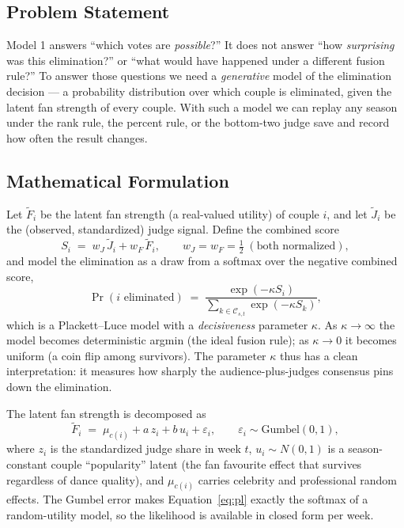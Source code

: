 \documentclass{article}
\begin{document}
\subsection{Problem Statement}

Model 1 answers ``which votes are \emph{possible}?'' It does not answer ``how
\emph{surprising} was this elimination?'' or ``what would have happened under a different
fusion rule?'' To answer those questions we need a \emph{generative} model of the
elimination decision --- a probability distribution over which couple is eliminated, given
the latent fan strength of every couple. With such a model we can replay any season under
the rank rule, the percent rule, or the bottom-two judge save and record how often the
result changes.

\subsection{Mathematical Formulation}

Let $\tilde F_i$ be the latent fan strength (a real-valued utility) of couple $i$, and let
$\tilde J_i$ be the (observed, standardized) judge signal. Define the combined score
\begin{equation}
S_i \;=\; w_J\,\tilde J_i + w_F\,\tilde F_i, \qquad w_J=w_F=\tfrac12 \;(\text{both normalized}),
\end{equation}
and model the elimination as a draw from a softmax over the negative combined score,
\begin{equation}
\Pr(i\text{ eliminated}) \;=\; \frac{\exp(-\kappa S_i)}{\sum_{k\in\mathcal{C}_{s,t}}\exp(-\kappa S_k)},
\label{eq:pl}\end{equation}
which is a Plackett--Luce model with a \emph{decisiveness} parameter $\kappa$. As
$\kappa\to\infty$ the model becomes deterministic argmin (the ideal fusion rule); as
$\kappa\to0$ it becomes uniform (a coin flip among survivors). The parameter $\kappa$ thus
has a clean interpretation: it measures how sharply the audience-plus-judges consensus pins
down the elimination.

The latent fan strength is decomposed as
\begin{equation}
\tilde F_i \;=\; \mu_{c(i)} + a\, z_i + b\, u_i + \varepsilon_i, \qquad \varepsilon_i\sim\mathrm{Gumbel}(0,1),
\end{equation}
where $z_i$ is the standardized judge share in week $t$, $u_i\sim N(0,1)$ is a
season-constant couple ``popularity'' latent (the fan favourite effect that survives
regardless of dance quality), and $\mu_{c(i)}$ carries celebrity and professional random
effects. The Gumbel error makes Equation~\eqref{eq:pl} exactly the softmax of a random-utility
model, so the likelihood is available in closed form per week.
\end{document}
